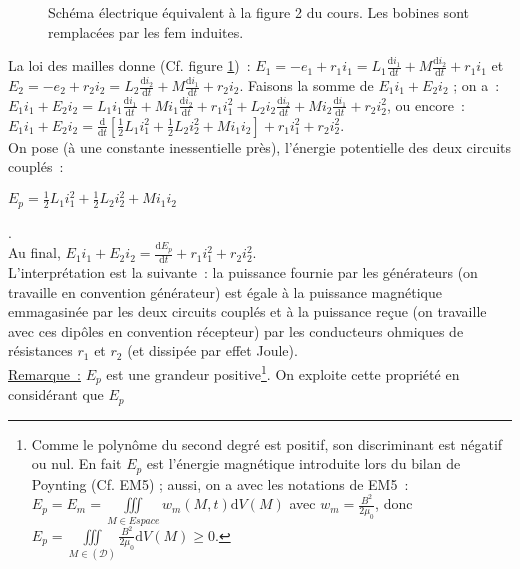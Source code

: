 \documentclass{article}
\newcommand{\mathcolorbox}[2]{\colorbox{#1}{$#2$}}
\let\oldiiint\iiint
\renewcommand{\iiint}{\oldiiint\limits}
\begin{document}
\begin{figure}[h]
\begin{center}
\end{center}
\caption{Schéma électrique équivalent à la figure 2 du cours. Les
bobines sont remplacées par les fem induites.}\label{Fig.6}
\end{figure}

La loi des mailles donne (Cf. figure \ref{Fig.6}) : $E_{1} =
-e_{1}+r_{1}i_{1} =
L_{1}\frac{\mathrm{d}i_{1}}{\mathrm{d}t}+M\frac{\mathrm{d}i_{2}}{\mathrm{d}t}+r_{1}i_{1}$ et $E_{2} =
-e_{2}+r_{2}i_{2} =
L_{2}\frac{\mathrm{d}i_{2}}{\mathrm{d}t}+M\frac{\mathrm{d}i_{1}}{\mathrm{d}t}+r_{2}i_{2}$. Faisons la
somme de $E_{1}i_{1}+E_{2}i_{2}$ ; on a : \\
$E_{1}i_{1}+E_{2}i_{2} =
L_{1}i_{1}\frac{\mathrm{d}i_{1}}{\mathrm{d}t}+Mi_{1}\frac{\mathrm{d}i_{2}}{\mathrm{d}t}+r_{1}i_{1}^{2}+
L_{2}i_{2}\frac{\mathrm{d}i_{2}}{\mathrm{d}t}+Mi_{2}\frac{\mathrm{d}i_{1}}{\mathrm{d}t}+r_{2}i_{2}^{2}$,
ou encore : \\
$E_{1}i_{1}+E_{2}i_{2} =
\frac{\mathrm{d}}{\mathrm{d}t}\left[\frac{1}{2}L_{1}i_{1}^{2}+\frac{1}{2}L_{2}i_{2}^{2}
+Mi_{1}i_{2}\right]+ r_{1}i_{1}^{2}+r_{2}i_{2}^{2}$. \\
On pose (à une constante inessentielle près), l'énergie potentielle
des deux circuits couplés : \\
\centerline{\mathcolorbox{gray!20}{E_{p} = \frac{1}{2}L_{1}i_{1}^{2}+\frac{1}{2}L_{2}i_{2}^{2} +
Mi_{1}i_{2}}}.
\\
Au final, $E_{1}i_{1}+E_{2}i_{2} = \frac{\mathrm{d}E_{p}}{\mathrm{d}t}+r_{1}i_{1}^{2}
+r_{2}i_{2}^{2}$. \\
L'interprétation est la suivante : la puissance fournie par les
générateurs (on travaille en convention générateur) est égale à la
puissance magnétique emmagasinée par les deux circuits couplés et à
la puissance reçue (on travaille avec ces dipôles en convention
récepteur) par les conducteurs ohmiques de résistances $r_{1}$ et
$r_{2}$ (et dissipée par effet Joule). \\
\underline{Remarque :} $E_{p}$ est une grandeur
positive\footnote{Comme le polynôme du second degré est positif, son
discriminant est négatif ou nul. En fait $E_{p}$ est l'énergie
magnétique introduite lors du bilan de Poynting (Cf. EM5) ; aussi,
on a avec les notations de EM5 : $E_{p} = E_{m} = \iiint_{M\in
Espace}w_{m}\left(M,t\right)\mathrm{d}V\left(M\right)$ avec $w_{m} = \frac{B^{2}}{2\mu_{0}}$, donc
$E_{p} = \iiint_{M \in \left(\mathcal{D}\right)} \frac{B^{2}}{2\mu_{0}}\mathrm{d}V\left(M\right)
\geq 0$.}. On exploite cette propriété en considérant que $E_{p}$
\end{document}
